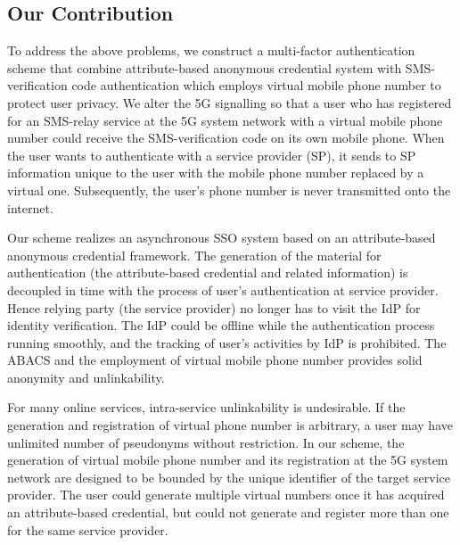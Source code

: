\subsection{Our Contribution}

To address the above problems, we construct a multi-factor authentication scheme that combine attribute-based anonymous credential system with SMS-verification code authentication which employs virtual mobile phone number to protect user privacy. We alter the 5G signalling so that a user who has registered for an SMS-relay service at the 5G system network with a virtual mobile phone number could receive the SMS-verification code on its own mobile phone. When the user wants to authenticate with a service provider (SP), it sends to SP information unique to the user with the mobile phone number replaced by a virtual one. Subsequently, the user's phone number is never transmitted onto the internet.

Our scheme realizes an asynchronous SSO system based on an attribute-based anonymous credential framework. The generation of the material for authentication (the attribute-based credential and related information) is decoupled in time with the process of user's authentication at service provider. Hence relying party (the service provider) no longer has to visit the IdP for identity verification. The IdP could be offline while the authentication process running smoothly, and the tracking of user's activities by IdP is prohibited. The ABACS and the employment of virtual mobile phone number provides solid anonymity and unlinkability.

For many online services, intra-service unlinkability is undesirable. If the generation and registration of virtual phone number is arbitrary, a user may have unlimited number of pseudonyms without restriction. 
In our scheme, the generation of virtual mobile phone number and its registration at the 5G system network are designed to be bounded by the unique identifier of the target service provider.
The user could generate multiple virtual numbers once it has acquired an attribute-based credential, but could not generate and register more than one for the same service provider. 





